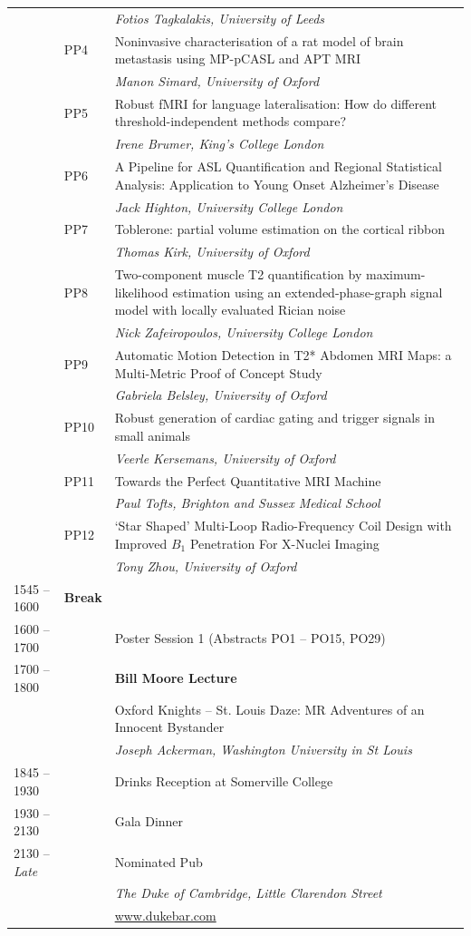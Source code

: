 \documentclass[a5paper,10pt,twoside,onecolumn,openany,helvetica,showtrims]{memoir}
\newlength{\JackBoxOne}
\newlength{\JackBoxTwo}
\newlength{\JackBoxThree}
\newlength{\LittleSkip}
\newcommand{\talkauthor}[1]{\small\emph{#1}}
\begin{document}
\begin{longtable}{p{\JackBoxOne}p{\JackBoxTwo}p{\JackBoxThree}}
& & \talkauthor{Fotios Tagkalakis, University of Leeds} \\ 
& PP4 & Noninvasive characterisation of a rat model of brain metastasis using MP-pCASL and APT MRI \\ 
&	& \talkauthor{Manon Simard, University of Oxford} \\
& PP5 & Robust fMRI for language lateralisation: How do different threshold-independent methods compare?\\
& 	& \talkauthor{Irene Brumer, King's College London} \\
& PP6 & A Pipeline for ASL Quantification and Regional Statistical Analysis: Application to Young Onset Alzheimer’s Disease \\ 
& & \talkauthor{Jack Highton, University College London}\\
& PP7 & Toblerone: partial volume estimation on the cortical ribbon\\ 
&   &   \talkauthor{Thomas Kirk, University of Oxford} \\
& PP8 & Two-component muscle T2 quantification by maximum-likelihood estimation using an extended-phase-graph signal model with locally evaluated Rician noise \\ 
&   &   \talkauthor{Nick Zafeiropoulos, University College London} \\
& PP9 & Automatic Motion Detection in T2* Abdomen MRI Maps: a Multi-Metric Proof of Concept Study \\ 
& & \talkauthor{Gabriela Belsley, University of Oxford} \\
& PP10  &  Robust generation of cardiac gating and trigger signals in small animals \\
& & \talkauthor{Veerle Kersemans, University of Oxford} \\ 
& PP11 & Towards the Perfect Quantitative MRI Machine \\
&   & \talkauthor{Paul Tofts, Brighton and Sussex Medical School} \\ 
& PP12 & `Star Shaped' Multi-Loop Radio-Frequency Coil Design with Improved $B_1$ Penetration For X-Nuclei Imaging \\ 
&   & \talkauthor{Tony Zhou, University of Oxford}\\
1545 -- 1600 & \textbf{Break} & \\
1600 -- 1700 & & Poster Session 1 (Abstracts PO1 -- PO15, PO29)\\[2em]
1700 -- 1800 & & \textbf{Bill Moore Lecture} \\
&& Oxford Knights -- St. Louis Daze: MR Adventures of an Innocent Bystander \\
&& \talkauthor{Joseph Ackerman, Washington University in St Louis} \\[2em]
1845 -- 1930 & & Drinks Reception at Somerville College \\[\LittleSkip]
1930 -- 2130 & & Gala Dinner \\[\LittleSkip] 
2130 -- \emph{Late} & & Nominated Pub\\
    &   & \talkauthor{The Duke of Cambridge, Little Clarendon Street} \\
    & & \url{www.dukebar.com}
\end{longtable}
\clearpage 
\end{document}
